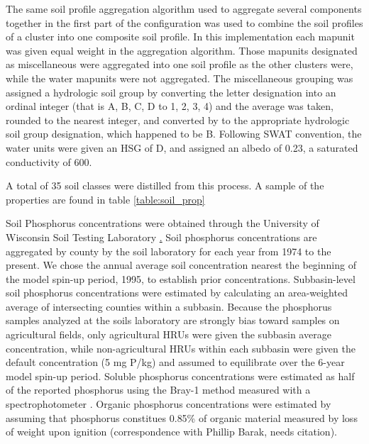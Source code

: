 The same soil profile aggregation algorithm \citep{beaudette_aqp_2013} used to aggregate several components together in the first part of the configuration was used to combine the soil profiles of a cluster into one composite soil profile. In this implementation each mapunit was given equal weight in the aggregation algorithm. Those mapunits designated as miscellaneous were aggregated into one soil profile as the other clusters were, while the water mapunits were not aggregated. The miscellaneous  grouping was assigned a hydrologic soil group by converting the letter designation into an ordinal integer (that is A, B, C, D to 1, 2, 3, 4) and the average was taken, rounded to the nearest integer, and converted by to the appropriate hydrologic soil group designation, which happened to be B. Following SWAT convention, the water units were given an HSG of D, and assigned an albedo of 0.23, a saturated conductivity of 600.

A total of 35 soil classes were distilled from this process. A sample of the properties are found in table \ref{table:soil_prop}


Soil Phosphorus concentrations were obtained through the University of Wisconsin Soil Testing Laboratory \href{http://uwlab.soils.wisc.edu/}. Soil phosphorus concentrations are aggregated by county by the soil laboratory for each year from 1974 to the present. We chose the annual average soil concentration nearest the beginning of the model spin-up period, 1995, to establish prior concentrations. Subbasin-level soil phosphorus concentrations were estimated by calculating an area-weighted average of intersecting counties within a subbasin. Because the phosphorus samples analyzed at the soils laboratory are strongly bias toward samples on agricultural fields, only agricultural HRUs were given the subbasin average concentration, while non-agricultural HRUs within each subbasin were given the default concentration (5 mg P/kg) and assumed to equilibrate over the 6-year model spin-up period. Soluble phosphorus concentrations were estimated as half of the reported phosphorus using the Bray-1 method measured with a spectrophotometer \citep{vadas_validating_2010}. Organic phosphorus concentrations were estimated by assuming that phosphorus constitues 0.85\% of organic material measured by loss of weight upon ignition (correspondence with Phillip Barak, needs citation).